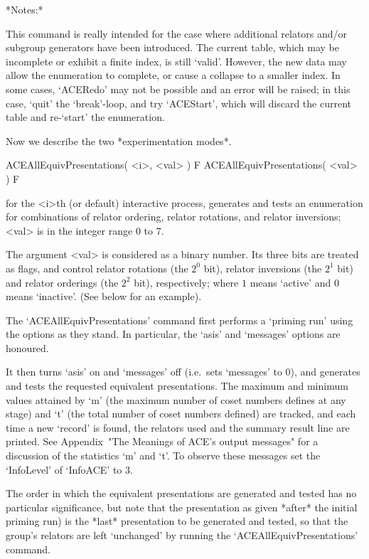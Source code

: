 *Notes:*

This command is really intended for the case where additional relators
and/or subgroup generators have been introduced.  The  current  table,
which  may  be  incomplete  or  exhibit  a  finite  index,  is   still
\lq{}valid'. However, the  new  data  may  allow  the  enumeration  to
complete, or cause a collapse to  a  smaller  index.  In  some  cases,
`ACERedo' may not be possible and an error will  be  raised;  in  this
case, `quit' the `break'-loop, and try `ACEStart', which will  discard
the current table and re-\lq{}start' the enumeration.

Now we describe the two *experimentation modes*.

\>ACEAllEquivPresentations( <i>, <val> ) F
\>ACEAllEquivPresentations( <val> ) F

for the <i>th (or default) interactive {\ACE} process,  generates  and
tests an enumeration for combinations  of  relator  ordering,  relator
rotations, and relator inversions; <val> is in the integer range 0  to
7.

The argument <val> is considered as a binary number.  Its  three  bits
are treated as flags, and control relator rotations (the  $2^0$  bit),
relator inversions (the $2^1$ bit) and relator  orderings  (the  $2^2$
bit),  respectively;  where  $1$  means  \lq{}active'  and  $0$  means
\lq{}inactive'. (See below for an example).

The `ACEAllEquivPresentations' command first performs  a  \lq{}priming
run' using the options as they stand. In particular,  the  `asis'  and
`messages' options are honoured.

It then turns `asis' on and `messages' off  (i.e.~sets  `messages'  to
0), and generates and tests the  requested  equivalent  presentations.
The maximum and minimum values attained by `m' (the maximum number  of
coset numbers defines at any stage) and `t' (the total number of coset
numbers defined) are tracked, and each  time  a  new  \lq{}record'  is
found, the relators used and the summary result line are printed.  See
Appendix~"The Meanings of ACE's output messages" for a  discussion  of
the statistics  `m'  and  `t'.  To  observe  these  messages  set  the
`InfoLevel' of `InfoACE' to 3.

The order in which the  equivalent  presentations  are  generated  and
tested has no particular significance, but note that the  presentation
as given *after* the initial priming run) is the  *last*  presentation
to be generated and tested, so that  the  group's  relators  are  left
\lq{}unchanged' by running the `ACEAllEquivPresentations' command.

